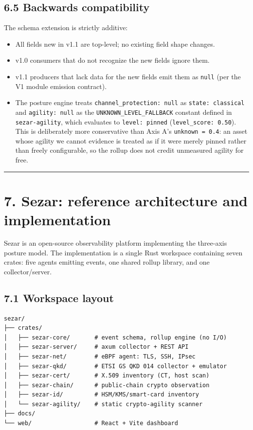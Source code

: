 \subsection{6.5 Backwards compatibility}\label{backwards-compatibility}

The schema extension is strictly additive:

\begin{itemize}
\tightlist
\item
  All fields new in v1.1 are top-level; no existing field shape changes.
\item
  v1.0 consumers that do not recognize the new fields ignore them.
\item
  v1.1 producers that lack data for the new fields emit them as
  \texttt{null} (per the V1 module emission contract).
\item
  The posture engine treats \texttt{channel\_protection:\ null} as
  \texttt{state:\ classical} and \texttt{agility:\ null} as the
  \texttt{UNKNOWN\_LEVEL\_FALLBACK} constant defined in
  \texttt{sezar-agility}, which evaluates to \texttt{level:\ pinned}
  (\texttt{level\_score:\ 0.50}). This is deliberately more conservative
  than Axis A's \texttt{unknown\ =\ 0.4}: an asset whose agility we
  cannot evidence is treated as if it were merely pinned rather than
  freely configurable, so the rollup does not credit unmeasured agility
  for free.
\end{itemize}

\begin{center}\rule{0.5\linewidth}{0.5pt}\end{center}

\section{7. Sezar: reference architecture and
implementation}\label{sezar-reference-architecture-and-implementation}

Sezar is an open-source observability platform implementing the
three-axis posture model. The implementation is a single Rust workspace
containing seven crates: five agents emitting events, one shared rollup
library, and one collector/server.

\subsection{7.1 Workspace layout}\label{workspace-layout}

\begin{verbatim}
sezar/
├── crates/
│   ├── sezar-core/       # event schema, rollup engine (no I/O)
│   ├── sezar-server/     # axum collector + REST API
│   ├── sezar-net/        # eBPF agent: TLS, SSH, IPsec
│   ├── sezar-qkd/        # ETSI GS QKD 014 collector + emulator
│   ├── sezar-cert/       # X.509 inventory (CT, host scan)
│   ├── sezar-chain/      # public-chain crypto observation
│   ├── sezar-id/         # HSM/KMS/smart-card inventory
│   └── sezar-agility/    # static crypto-agility scanner
├── docs/
└── web/                  # React + Vite dashboard
\end{verbatim}

